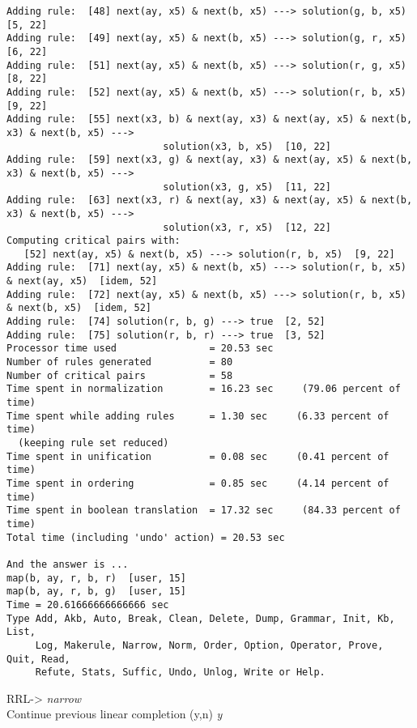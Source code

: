 \begin{verbatim}
Adding rule:  [48] next(ay, x5) & next(b, x5) ---> solution(g, b, x5)  [5, 22]
Adding rule:  [49] next(ay, x5) & next(b, x5) ---> solution(g, r, x5)  [6, 22]
Adding rule:  [51] next(ay, x5) & next(b, x5) ---> solution(r, g, x5)  [8, 22]
Adding rule:  [52] next(ay, x5) & next(b, x5) ---> solution(r, b, x5)  [9, 22]
Adding rule:  [55] next(x3, b) & next(ay, x3) & next(ay, x5) & next(b, x3) & next(b, x5) --->
                           solution(x3, b, x5)  [10, 22]
Adding rule:  [59] next(x3, g) & next(ay, x3) & next(ay, x5) & next(b, x3) & next(b, x5) --->  
                           solution(x3, g, x5)  [11, 22]
Adding rule:  [63] next(x3, r) & next(ay, x3) & next(ay, x5) & next(b, x3) & next(b, x5) --->  
                           solution(x3, r, x5)  [12, 22]
Computing critical pairs with: 
   [52] next(ay, x5) & next(b, x5) ---> solution(r, b, x5)  [9, 22]
Adding rule:  [71] next(ay, x5) & next(b, x5) ---> solution(r, b, x5) & next(ay, x5)  [idem, 52]
Adding rule:  [72] next(ay, x5) & next(b, x5) ---> solution(r, b, x5) & next(b, x5)  [idem, 52]
Adding rule:  [74] solution(r, b, g) ---> true  [2, 52]
Adding rule:  [75] solution(r, b, r) ---> true  [3, 52]
Processor time used                = 20.53 sec
Number of rules generated          = 80
Number of critical pairs           = 58
Time spent in normalization        = 16.23 sec     (79.06 percent of time)
Time spent while adding rules      = 1.30 sec     (6.33 percent of time)
  (keeping rule set reduced)
Time spent in unification          = 0.08 sec     (0.41 percent of time)
Time spent in ordering             = 0.85 sec     (4.14 percent of time)
Time spent in boolean translation  = 17.32 sec     (84.33 percent of time)
Total time (including 'undo' action) = 20.53 sec

And the answer is ...
map(b, ay, r, b, r)  [user, 15]
map(b, ay, r, b, g)  [user, 15]
Time = 20.61666666666666 sec
Type Add, Akb, Auto, Break, Clean, Delete, Dump, Grammar, Init, Kb, List,
     Log, Makerule, Narrow, Norm, Order, Option, Operator, Prove, Quit, Read,
     Refute, Stats, Suffic, Undo, Unlog, Write or Help.
\end{verbatim}
RRL-> {\em narrow}\\
Continue previous linear completion (y,n) {\em y}
